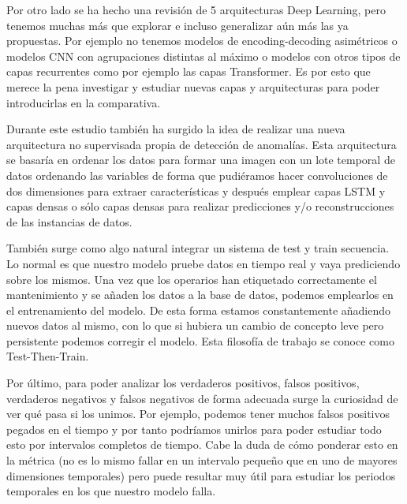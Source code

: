 Por otro lado se ha hecho una revisión de 5 arquitecturas Deep Learning, pero tenemos muchas más que explorar e incluso generalizar aún más las ya propuestas. Por ejemplo no tenemos modelos de encoding-decoding asimétricos o modelos CNN con agrupaciones distintas al máximo o modelos con otros tipos de capas recurrentes como por ejemplo las capas Transformer. Es por esto que merece la pena investigar y estudiar nuevas capas y arquitecturas para poder introducirlas en la comparativa.

Durante este estudio también ha surgido la idea de realizar una nueva arquitectura no supervisada propia de detección de anomalías. Esta arquitectura se basaría en ordenar los datos para formar una imagen con un lote temporal de datos ordenando las variables de forma que pudiéramos hacer convoluciones de dos dimensiones para extraer características y después emplear capas LSTM y capas densas o sólo capas densas para realizar predicciones y/o reconstrucciones de las instancias de datos.

También surge como algo natural integrar un sistema de test y train secuencia. Lo normal es que nuestro modelo pruebe datos en tiempo real y vaya prediciendo sobre los mismos. Una vez que los operarios han etiquetado correctamente el mantenimiento y se añaden los datos a la base de datos, podemos emplearlos en el entrenamiento del modelo. De esta forma estamos constantemente añadiendo nuevos datos al mismo, con lo que si hubiera un cambio de concepto leve pero persistente podemos corregir el modelo. Esta filosofía de trabajo se conoce como Test-Then-Train.

Por último, para poder analizar los verdaderos positivos, falsos positivos, verdaderos negativos y falsos negativos de forma adecuada surge la curiosidad de ver qué pasa si los unimos. Por ejemplo, podemos tener muchos falsos positivos pegados en el tiempo y por tanto podríamos unirlos para poder estudiar todo esto por intervalos completos de tiempo. Cabe la duda de cómo ponderar esto en la métrica (no es lo mismo fallar en un intervalo pequeño que en uno de mayores dimensiones temporales) pero puede resultar muy útil para estudiar los periodos temporales en los que nuestro modelo falla.